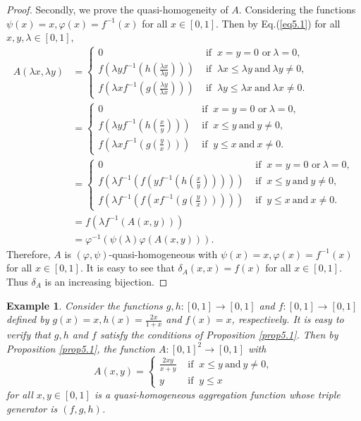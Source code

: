 \documentclass[12pt]{article}
\newtheorem{example}{\bf Example}[section]
\begin{document}
\begin{proof}
Secondly, we prove the quasi-homogeneity of $A$. Considering the functions $\psi(x)=x, \varphi(x)=f^{-1}(x)$ for all $x\in[0,1]$. Then by Eq.(\ref{eq5.1}) for all $x, y, \lambda\in[0,1]$,
\begin{equation*}
\begin{split}
A(\lambda x, \lambda y)&=\left\{\begin{array}{ll}
0 & {\mbox{ if }\  x=y=0  \mbox{ or}\  \lambda=0,}\\
f(\lambda yf^{-1}(h(\frac{\lambda x}{\lambda y}))) & {\mbox{ if }\  \lambda x\leq \lambda y \ \mbox{and}\  \lambda y\neq0,}\\
f(\lambda xf^{-1}(g(\frac{\lambda y}{\lambda x}))) & {\mbox{ if }\  \lambda y\leq \lambda x \ \mbox{and}\ \lambda x\neq0.}
\end{array}
\right. \\
&=\left\{\begin{array}{ll}
0 & {\mbox{ if }\  x=y=0  \mbox{ or}\  \lambda=0,}\\
f(\lambda yf^{-1}(h(\frac{x}{y}))) & {\mbox{ if }\ x\leq y \ \mbox{and}\ y\neq0,}\\
f(\lambda xf^{-1}(g(\frac{y}{x}))) & {\mbox{ if }\ y\leq x \ \mbox{and}\ x\neq0.}
\end{array}
\right.\\
&=\left\{\begin{array}{ll}
0 & {\mbox{ if }\  x=y=0  \mbox{ or}\  \lambda=0,}\\
f(\lambda f^{-1}(f(yf^{-1}(h(\frac{x}{y}))))) & {\mbox{ if }\ x\leq y \ \mbox{and}\ y\neq0,}\\
f(\lambda f^{-1}(f(xf^{-1}(g(\frac{y}{x}))))) & {\mbox{ if }\ y\leq x \ \mbox{and}\ x\neq0.}
\end{array}
\right.\\
&=f(\lambda f^{-1}( A( x, y)))\\
&=\varphi^{-1}(\psi(\lambda )\varphi( A( x, y))).
\end{split}
\end{equation*}
Therefore, $A$ is $(\varphi, \psi)$-quasi-homogeneous with $\psi(x)=x, \varphi(x)=f^{-1}(x)$ for all $x\in[0,1]$. It is easy to see that $\delta_{A}(x,x)=f(x)$ for all $x\in[0,1]$. Thus $\delta_{A}$ is an increasing bijection.
\end{proof}

\begin{example}\label{example5.1}
\emph{Consider the functions $g, h:[0, 1]\rightarrow[0, 1]$ and $f:[0, 1]\rightarrow[0, 1]$ defined by $g(x)=x, h(x)=\frac {2x}{1+x}$ and $f(x)=x$, respectively. It is easy to verify that $g, h$ and $f$ satisfy the conditions of Proposition \ref{prop5.1}. Then by Proposition \ref{prop5.1}, the function $A:[0, 1]^2\rightarrow[0, 1]$ with
$$A(x,y)=\left\{\begin{array}{ll}
\frac {2xy}{x+y} & {\mbox{ if }\ x\leq y \ \mbox{and}\ y\neq0,}\\
y & {\mbox{ if }\ y\leq x}
\end{array}
\right.
$$
for all $x,y\in[0, 1]$ is a quasi-homogeneous aggregation function whose triple generator is $(f,g,h)$.}
\end{example}
\end{document}
